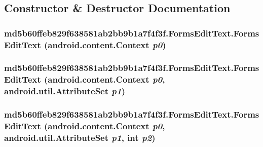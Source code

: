 \subsection{Constructor \& Destructor Documentation}
\hypertarget{classmd5b60ffeb829f638581ab2bb9b1a7f4f3f_1_1_forms_edit_text_3b62a7c8e08706ae0e5e3fc89d15870f}{
\subsubsection[{FormsEditText}]{\setlength{\rightskip}{0pt plus 5cm}md5b60ffeb829f638581ab2bb9b1a7f4f3f.FormsEditText.FormsEditText (android.content.Context {\em p0})}}
\label{classmd5b60ffeb829f638581ab2bb9b1a7f4f3f_1_1_forms_edit_text_3b62a7c8e08706ae0e5e3fc89d15870f}


\hypertarget{classmd5b60ffeb829f638581ab2bb9b1a7f4f3f_1_1_forms_edit_text_fcf275c44999585a2a5d2eedde13e104}{
\subsubsection[{FormsEditText}]{\setlength{\rightskip}{0pt plus 5cm}md5b60ffeb829f638581ab2bb9b1a7f4f3f.FormsEditText.FormsEditText (android.content.Context {\em p0}, \/  android.util.AttributeSet {\em p1})}}
\label{classmd5b60ffeb829f638581ab2bb9b1a7f4f3f_1_1_forms_edit_text_fcf275c44999585a2a5d2eedde13e104}


\hypertarget{classmd5b60ffeb829f638581ab2bb9b1a7f4f3f_1_1_forms_edit_text_aba2de54573e38c8c55109e4735d016a}{
\subsubsection[{FormsEditText}]{\setlength{\rightskip}{0pt plus 5cm}md5b60ffeb829f638581ab2bb9b1a7f4f3f.FormsEditText.FormsEditText (android.content.Context {\em p0}, \/  android.util.AttributeSet {\em p1}, \/  int {\em p2})}}
\label{classmd5b60ffeb829f638581ab2bb9b1a7f4f3f_1_1_forms_edit_text_aba2de54573e38c8c55109e4735d016a}



